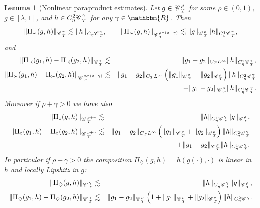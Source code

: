 \documentclass{amsart}
\newtheorem{lemma}[theorem]{Lemma}
\theoremstyle{remark}
\theoremstyle{definition}
\newcommand{\CC}{\mathscr{C} \hspace{.1em}}
\begin{document}
\begin{lemma}[Nonlinear paraproduct estimates]
  \label{l:decomp-est} Let $g \in \CC_T^{\rho}$ for some $\rho \in (0, 1)$, $g
  \in [\lambda, 1]$, and $h \in C^2_{\eta} \CC_T^{\gamma}$ for any $\gamma \in
  \mathbbm{R}$. Then
  \[ \| \Pi_{\prec} (g, h) \|_{\CC^{\gamma}_T} \lesssim \| h \|_{C_{\eta}
     \CC^{\gamma}_T}, \qquad \| \Pi_{\succ} (g, h) \|_{\CC^{\rho \wedge (\rho
     + \gamma)}_T} \lesssim \| g \|_{\CC^{\rho}_T} \| h \|_{C_{\eta}^1
     \CC^{\gamma}_T}, \]
  and
  \begin{eqnarray*}
    \| \Pi_{\prec} (g_1, h) - \Pi_{\prec} (g_2, h) \|_{\CC^{\gamma}_T} &
    \lesssim & \| g_1 - g_2 \|_{C_T L^{\infty}} \| h \|_{C_{\eta}^1
    \CC^{\gamma}_T},\\
    \| \Pi_{\succ} (g_1, h) - \Pi_{\succ} (g_2, h) \|_{\CC_T^{\rho \wedge
    (\rho + \gamma)}} & \lesssim & \| g_1 - g_2 \|_{C_T L^{\infty}} \left( \|
    g_1 \|_{\CC^{\rho}_T} + \| g_2 \|_{\CC^{\rho}_T} \right) \| h
    \|_{C_{\eta}^2 \CC^{\gamma}_T}\\
    &  & + \| g_1 - g_2 \|_{\CC^{\rho}_T} \| h \|_{C_{\eta}^1 \CC^{\gamma}_T}
    .
  \end{eqnarray*}
  Moreover if $\rho + \gamma > 0$ we have also
  \begin{eqnarray*}
    \| \Pi_{\circ} (g, h) \|_{\CC^{\rho + \gamma}_T} & \lesssim & \| h
    \|_{C_{\eta}^1 \CC^{\gamma}_T} \| g \|_{\CC^{\rho}_T},\\
    \| \Pi_{\circ} (g_1, h) - \Pi_{\circ} (g_2, h) \|_{\CC_T^{\rho + \gamma}}
    & \lesssim & \| g_1 - g_2 \|_{C_T L^{\infty}} \left( \| g_1
    \|_{\CC^{\rho}_T} + \| g_2 \|_{\CC^{\rho}_T} \right) \| h \|_{C_{\eta}^2
    \CC^{\gamma}_T}\\
    &  & + \| g_1 - g_2 \|_{\CC^{\rho}_T} \| h \|_{C_{\eta}^1 \CC^{\gamma}_T}
    .
  \end{eqnarray*}
  In particular if $\rho + \gamma > 0$ the composition $\Pi_{\diamondsuit} (g,
  h) = h (g (\cdot), \cdot)$ is linear in $h$ and locally Lipshitz in $g$:
  \begin{eqnarray*}
    \| \Pi_{\diamondsuit} (g, h) \|_{\CC_T^{\gamma}} & \lesssim & \| h
    \|_{C_{\eta}^1 \CC^{\gamma}_T} \| g \|_{\CC^{\rho}_T},\\
    \| \Pi_{\diamondsuit} (g_1, h) - \Pi_{\diamondsuit} (g_2, h)
    \|_{\CC_T^{\gamma}} & \lesssim & \| g_1 - g_2 \|_{\CC^{\rho}_T} \left( 1 +
    \| g_1 \|_{\CC^{\rho}_T} + \| g_2 \|_{\CC^{\rho}_T} \right) \| h
    \|_{C_{\eta}^2 \CC^{\gamma}} .
  \end{eqnarray*}
\end{lemma}
\end{document}
